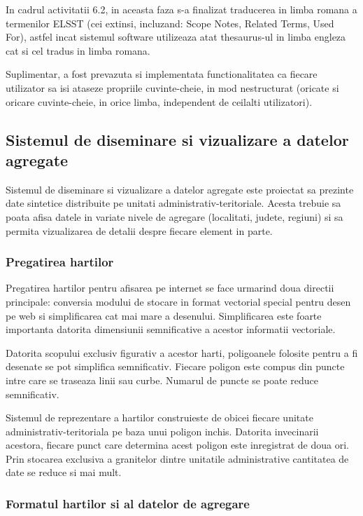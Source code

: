 \documentclass[a4paper, 10pt]{article}
\begin{document}
{In cadrul activitatii 6.2, in aceasta faza s-a finalizat traducerea in limba romana a termenilor ELSST (cei extinsi, incluzand: Scope Notes, Related Terms, Used For), 
astfel incat sistemul software utilizeaza atat thesaurus-ul in limba engleza cat si cel tradus in limba romana.

Suplimentar, a fost prevazuta si implementata functionalitatea ca fiecare utilizator sa isi ataseze propriile cuvinte-cheie,
in mod nestructurat (oricate si oricare cuvinte-cheie, in orice limba, independent de ceilalti utilizatori).

\subsection{Sistemul de diseminare si vizualizare a datelor agregate}

Sistemul de diseminare si vizualizare a datelor agregate este proiectat sa prezinte date sintetice 
distribuite pe unitati administrativ-teritoriale. 
Acesta trebuie sa poata afisa datele in variate nivele de agregare (localitati, judete, regiuni) 
si sa permita vizualizarea de detalii despre fiecare element in parte. 

\subsubsection{Pregatirea hartilor}

Pregatirea hartilor pentru afisarea pe internet se face urmarind doua directii principale: 
conversia modului de stocare in format vectorial special pentru desen pe web si simplificarea cat mai mare a desenului. 
Simplificarea este foarte importanta datorita dimensiunii semnificative a acestor informatii vectoriale. 

Datorita scopului exclusiv figurativ a acestor harti, poligoanele folosite pentru a fi desenate se pot simplifica semnificativ. Fiecare poligon este compus din puncte intre care se traseaza linii sau curbe. Numarul de puncte se poate reduce semnificativ. 

Sistemul de reprezentare a hartilor construieste de obicei fiecare unitate administrativ-teritoriala pe baza unui poligon inchis. Datorita invecinarii acestora, fiecare punct care determina acest poligon este inregistrat de doua ori. Prin stocarea exclusiva a granitelor dintre unitatile administrative cantitatea de date se reduce si mai mult. 

\subsubsection{Formatul hartilor si al datelor de agregare}

}
\end{document}

